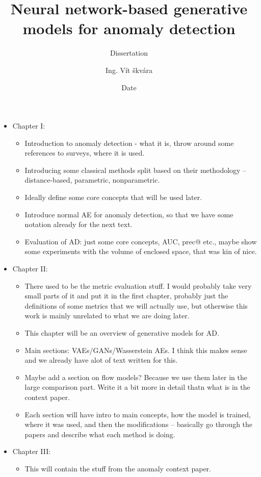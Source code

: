 \documentclass[twoside, a4paper, 12pt]{book}
\title{Neural network-based generative models for anomaly detection}
\subtitle{Dissertation}
\author{Ing. Vít škvára}
\date{Date}
\begin{document}
\maketitle


\begin{itemize}
	\item Chapter I: 
		\begin{itemize}
			\item Introduction to anomaly detection - what it is, throw around some references to surveys, where it is used.
			\item Introducing some classical methods split based on their methodology -- distance-based, parametric, nonparametric.
			\item Ideally define some core concepts that will be used later.
			\item Introduce normal AE for anomaly detection, so that we have some notation already for the next text.
			\item Evaluation of AD: just some core concepts, AUC, prec@ etc., maybe show some experiments with the volume of enclosed space, that was kin of nice.
		\end{itemize}
	\item Chapter II:
	\begin{itemize}
			\item There used to be the metric evaluation stuff. I would probably take very small parts of it and put it in the first chapter, probably just the definitions of some metrics that we will actually use, but otherwise this work is mainly unrelated to what we are doing later.
			\item This chapter will be an overview of generative models for AD.
			\item Main sections: VAEs/GANs/Wasserstein AEs. I think this makes sense and we already have alot of text written for this.
			\item Maybe add a section on flow models? Because we use them later in the large comparison part. Write it a bit more in detail thatn what is in the context paper.
			\item Each section will have intro to main concepts, how the model is trained, where it was used, and then the modifications -- basically go through the papers and describe what each method is doing.
		\end{itemize}
	\item Chapter III: 
		\begin{itemize}
			\item This will contain the stuff from the anomaly context paper.

\end{itemize}
\end{itemize}
\end{document}
